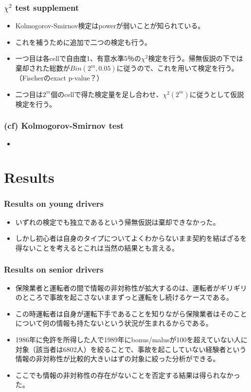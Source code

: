 \documentclass[dvipdfmx, 12pt]{beamer}
\begin{document}
\begin{frame}\frametitle{$\chi^2$ test supplement}
	\begin{itemize}
	\item Kolmogorov-Smirnov検定はpowerが弱いことが知られている。
	\item これを補うために追加で二つの検定も行う。
	\item 一つ目は各cellで自由度1、有意水準5％の$\chi^2$検定を行う。帰無仮説の下では棄却された総数が$Bin(2^m, 0.05)$に従うので、これを用いて検定を行う。（Fischerのexact p-value？）
	\item 二つ目は$2^m$個のcellで得た検定量を足し合わせ、$\chi^2(2^m)$に従うとして仮説検定を行う。
	\end{itemize}
\end{frame}

\begin{frame}\frametitle{(cf) Kolmogorov-Smirnov test}
	\begin{itemize}
	\item 
	\end{itemize}
\end{frame}

\section{Results}
\begin{frame}\frametitle{Results on young drivers}
	\begin{itemize}
	\item いずれの検定でも独立であるという帰無仮説は棄却できなかった。
	\item しかし初心者は自身のタイプについてよくわからないまま契約を結ばざるを得ないことを考えるとこれは当然の結果とも言える。
	\end{itemize}
\end{frame}

\begin{frame}\frametitle{Results on senior drivers}
	\begin{itemize}
	\item 保険業者と運転者の間で情報の非対称性が拡大するのは、運転者がギリギリのところで事故を起こさないままずっと運転をし続けるケースである。
	\item この時運転者は自身が運転下手であることを知りながら保険業者はそのことについて何の情報も持たないという状況が生まれるからである。
	\item 1986年に免許を所得した人で1989年にbonus/malusが100を超えていない人に対象（該当者は6802人）を絞ることで、事故を起こしていない経験者という情報の非対称性が比較的大きいはずの対象に絞った分析ができる。
	\item ここでも情報の非対称性の存在がないことを否定する結果は得られなかった。
	\end{itemize}
\end{frame}
\end{document}
